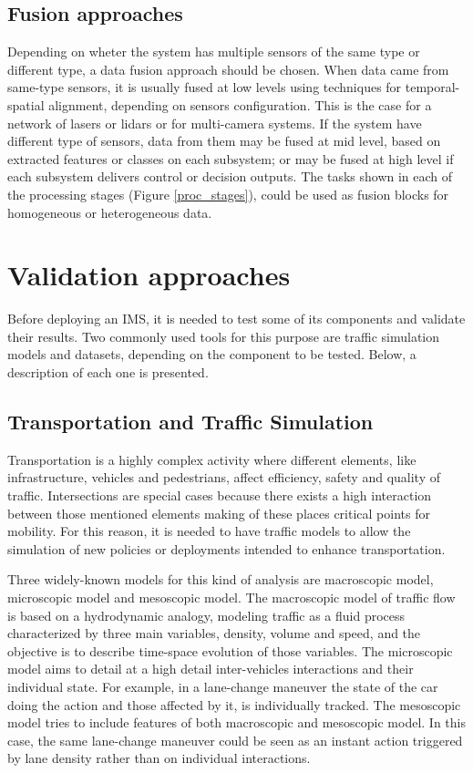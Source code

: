 \subsection{Fusion approaches}

Depending on wheter the system has multiple sensors of the same type or different type, a data fusion approach should be chosen. When data came from same-type sensors, it is usually fused at low levels using techniques for temporal-spatial alignment, depending on sensors configuration. This is the case for a network of lasers or lidars or for multi-camera systems. If the system have different type of sensors, data from them may be fused at mid level, based on extracted features or classes on each subsystem; or may be fused at high level if each subsystem delivers control or decision outputs. The tasks shown in each of the processing stages (Figure \ref{proc_stages}), could be used as fusion blocks for homogeneous or heterogeneous data.

\section{Validation approaches}

Before deploying an IMS, it is needed to test some of its components and validate their results. Two commonly used tools for this purpose are traffic simulation models and datasets, depending on the component to be tested. Below, a description of each one is presented.

\subsection{Transportation and Traffic Simulation}

Transportation is a highly complex activity where different elements, like infrastructure, vehicles and pedestrians, affect efficiency, safety and quality of traffic. Intersections are special cases because there exists a high interaction between those mentioned elements making of these places critical points for mobility. For this reason, it is needed to have traffic models to allow the simulation of new policies or deployments intended to enhance transportation.

Three widely-known models for this kind of analysis are macroscopic model, microscopic model and mesoscopic model. The macroscopic model of traffic flow is based on a hydrodynamic analogy, modeling traffic as a fluid process characterized by three main variables, density, volume and speed, and the objective is to describe time-space evolution of those variables. The microscopic model aims to detail at a high detail inter-vehicles interactions and their individual state. For example, in a lane-change maneuver the state of the car doing the action and those affected by it, is individually tracked. The mesoscopic model tries to include features of both macroscopic and mesoscopic model. In this case, the same lane-change maneuver could be seen as an instant action triggered by lane density rather than on individual interactions.

